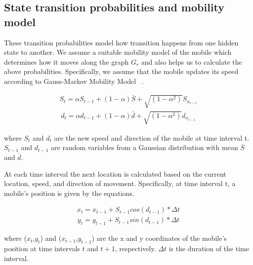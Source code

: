 \documentclass[conference, 10pt]{IEEEtran}
\begin{document}
\subsection{State transition probabilities and mobility model} 
\label{sec:statemodel}
These transition
probabilities model how transition happens from one hidden state
to another. 
We assume a suitable mobility model of the mobile which determines how it moves
along the graph $G_r$ and also helps us to calculate the above probabilities. Specifically, we
assume that the mobile updates its speed according to Gauss-Markov Mobility Model ~\cite{Camp2002}.

\begin{align}
S_t = \alpha S_{t-1}+(1-\alpha)\bar{S}+\sqrt{(1-\alpha^2)}S_{x_{t-1}}
\label{eqn:speed}
\end{align}
\begin{align}
d_t = \alpha d_{t-1}+(1-\alpha)\bar{d}+\sqrt{(1-\alpha^2)}d_{x_{t-1}}
\label{eqn:speed}
\end{align}

 where $S_t$ and $d_t$ are the new speed and direction of the mobile at time interval t. $S_{t-1}$ and $d_{t-1}$
 are random variables from a Gaussian distribution with mean $\bar{S}$ and $\bar{d}$.
 
 At each time interval the next location is calculated based on the current location, speed, and direction of movement.
Specifically, at time interval t, a mobile's position is given by the equations.

\begin{align}
	x_t = x_{t-1} +S_{t-1}cos(d_{t-1})*\Delta t
\label{eqn:mobilitymodelx}
\end{align}
\begin{align}
y_t = y_{t-1} +S_{t-1}sin(d_{t-1})*\Delta t
\label{eqn:mobilitymodely}
\end{align}

where ($x_t$,$y_t$) and ($x_{t-1}$,$y_{t-1}$) are the x and y coordinates of the mobile’s position 
at time intervals $t$ and $t+1$, respectively. $\Delta t$ is the duration of the time interval.
\end{document}
